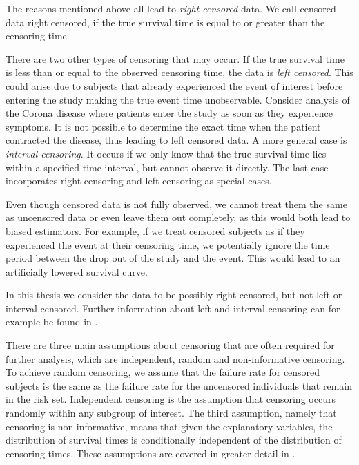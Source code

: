 \documentclass[12pt, a4paper]{scrartcl}
\theoremstyle{definition}
\theoremstyle{plain}
\numberwithin{equation}{section}
\numberwithin{figure}{section}
\numberwithin{table}{section}
\begin{document}
	The reasons mentioned above all lead to \emph{right censored} data.
	We call censored data right censored, if the true survival time is equal to or greater than the censoring time.
	
	There are two other types of censoring that may occur.
	If the true survival time is less than or equal to the observed censoring time, the data is \emph{left censored}.
	This could arise due to subjects that already experienced the event of interest before entering the study making the true event time unobservable.
	Consider analysis of the Corona disease where patients enter the study as soon as they experience symptoms.
	It is not possible to determine the exact time when the patient contracted the disease, thus leading to left censored data.
	A more general case is \emph{interval censoring}.
	It occurs if we only know that the true survival time lies within a specified time interval, but cannot observe it directly.
	The last case incorporates right censoring and left censoring as special cases.
	
	Even though censored data is not fully observed, we cannot treat them the same as uncensored data or even leave them out completely, as this would both lead to biased estimators.
	For example, if we treat censored subjects as if they experienced the event at their censoring time, we potentially ignore the time period between the drop out of the study and the event.
	This would lead to an artificially lowered survival curve.
		
	In this thesis we consider the data to be possibly right censored, but not left or interval censored.
	Further information about left and interval censoring can for example be found in \citet*{bookfailuretime}.
	
	There are three main assumptions about censoring that are often required for further analysis, which are independent, random and non-informative censoring.
	To achieve random censoring, we assume that the failure rate for censored subjects is the same as the failure rate for the uncensored individuals that remain in the risk set.
	Independent censoring is the assumption that censoring occurs randomly within any subgroup of interest.
	The third assumption, namely that censoring is non-informative, means that given the explanatory variables, the distribution of survival times is conditionally independent of the distribution of censoring times.
	These assumptions are covered in greater detail in \citet*{bookfailuretime}.
	
\end{document}
